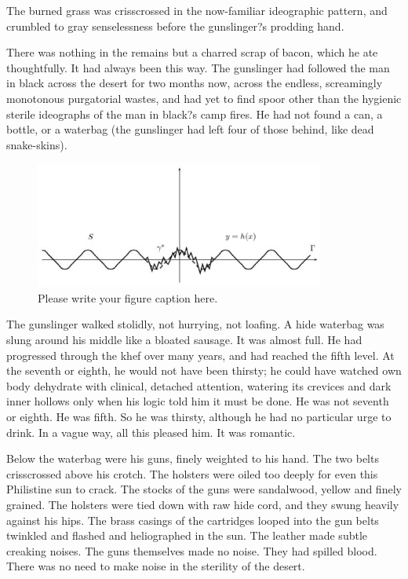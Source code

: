 \documentclass[
11pt,%
tightenlines,%
twoside,%
onecolumn,%
nofloats,%
nobibnotes,%
nofootinbib,%
superscriptaddress,%
noshowpacs,%
centertags]%
{revtex4}
\begin{document}
The burned grass was crisscrossed in the now-familiar ideographic pattern, and crumbled to gray senselessness before the gunslinger?s prodding hand. 

There was nothing in the remains but a charred scrap of bacon, which he ate thoughtfully. It had always been this way. The gunslinger had followed the man in black across the desert for two months now, across the endless, screamingly monotonous purgatorial wastes, and had yet to find spoor other than the hygienic sterile ideographs of the man in black?s camp fires. He had not found a can, a bottle, or a waterbag (the gunslinger had left four of those behind, like dead snake-skins).

\begin{figure}[h]
\setcaptionmargin{5mm}
\onelinecaptionstrue  %
\includegraphics[width=0.85\textwidth]{deform.eps}
\caption{Please write your figure caption here.}\label{fig:1}
\end{figure}

The gunslinger walked stolidly, not hurrying, not loafing. A hide waterbag was slung around his middle like a bloated sausage. It was almost full. He had progressed through the khef over many years, and had reached the fifth level. At the seventh or eighth, he would not have been thirsty; he could have watched own body dehydrate with clinical, detached attention, watering its crevices and dark inner hollows only when his logic told him it must be done. He was not seventh or eighth. He was fifth. So he was thirsty, although he had no particular urge to drink. In a vague way, all this pleased him. It was romantic.

Below the waterbag were his guns, finely weighted to his hand. The two belts crisscrossed above his crotch. The holsters were oiled too deeply for even this Philistine sun to crack. The stocks of the guns were sandalwood, yellow and finely grained. The holsters were tied down with raw hide cord, and they swung heavily against his hips. The brass casings of the cartridges looped into the gun belts twinkled and flashed and heliographed in the sun. The leather made subtle creaking noises. The guns themselves made no noise. They had spilled blood. There was no need to make noise in the sterility of the desert.
\end{document}

